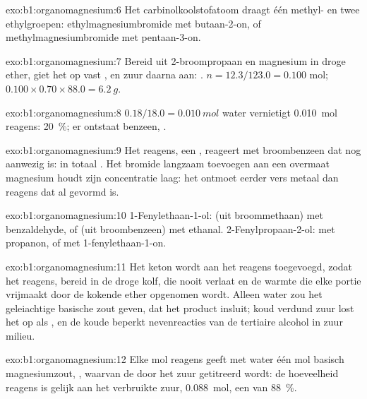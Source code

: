 \begin{solution}{exo:b1:organomagnesium:6}
Het carbinolkoolstofatoom draagt één methyl- en twee ethylgroepen:
ethylmagnesiumbromide met butaan-2-on, of methylmagnesiumbromide met
pentaan-3-on.
\end{solution}

\begin{solution}{exo:b1:organomagnesium:7}
Bereid  uit 2-broompropaan en magnesium in droge ether,
giet het op vast , en zuur daarna aan: .
$n = 12.3/123.0 = 0.100$ mol;
$0.100 \times 0.70 \times 88.0 = \qty{6.2}{g}$.
\end{solution}

\begin{solution}{exo:b1:organomagnesium:8}
$0.18/18.0 = \qty{0.010}{mol}$ water vernietigt \qty{0.010}{mol}
reagens: \qty{20}{\percent}; er ontstaat benzeen,
.
\end{solution}

\begin{solution}{exo:b1:organomagnesium:9}
Het reagens, een , reageert met broombenzeen dat nog aanwezig
is: in totaal . Het bromide
langzaam toevoegen aan een overmaat magnesium houdt zijn concentratie
laag: het ontmoet eerder vers metaal dan reagens dat al gevormd is.
\end{solution}

\begin{solution}{exo:b1:organomagnesium:10}
1-Fenylethaan-1-ol:  (uit broommethaan) met benzaldehyde, of
 (uit broombenzeen) met ethanal. 2-Fenylpropaan-2-ol:
 met propanon, of  met
1-fenylethaan-1-on.
\end{solution}

\begin{solution}{exo:b1:organomagnesium:11}
Het keton wordt aan het reagens toegevoegd, zodat het reagens, bereid in
de droge kolf, die nooit verlaat en de warmte die elke portie vrijmaakt
door de kokende ether opgenomen wordt. Alleen water zou het geleiachtige
basische zout  geven, dat het product insluit; koud verdund
zuur lost het op als , en de koude beperkt nevenreacties van de
tertiaire alcohol in zuur milieu.
\end{solution}

\begin{solution}{exo:b1:organomagnesium:12}
Elke mol reagens geeft met water één mol basisch magnesiumzout,
, waarvan de  door het zuur
getitreerd wordt: de hoeveelheid reagens is gelijk aan het verbruikte
zuur, \qty{0.088}{mol}, een  van \qty{88}{\percent}.
\end{solution}

